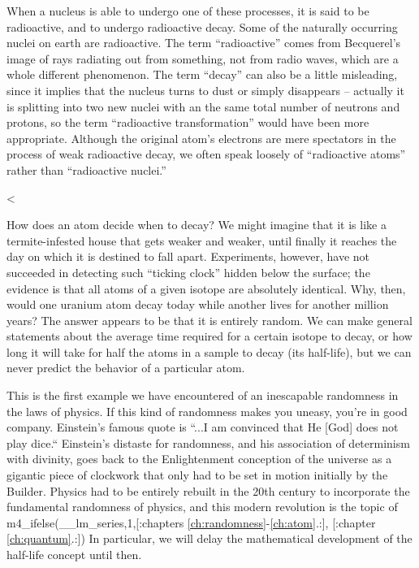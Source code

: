         When a nucleus is able to undergo one of these processes, it
        is said to be radioactive, and to undergo radioactive decay.
        Some of the naturally occurring nuclei on earth are
        radioactive. The term ``radioactive'' comes from Becquerel's
        image of rays radiating out from something, not from radio
        waves, which are a whole different phenomenon. The term
        ``decay'' can also be a little misleading, since it implies
        that the nucleus turns to dust or simply disappears --
        actually it is splitting into two new nuclei with an the
        same total number of neutrons and protons, so the term
        ``radioactive transformation'' would have been more
        appropriate. Although the original atom's electrons are mere
        spectators in the process of weak radioactive decay, we
        often speak loosely of ``radioactive atoms'' rather than
        ``radioactive nuclei.''

    <%

        How does an atom decide when to decay? We might imagine that
        it is like a termite-infested house that gets weaker and
        weaker, until finally it reaches the day on which it is
        destined to fall apart. Experiments, however, have not
        succeeded in detecting such ``ticking clock'' hidden below
        the surface; the evidence is that all atoms of a given
        isotope are absolutely identical. Why, then, would one
        uranium atom decay today while another lives for another
        million years? The answer appears to be that it is entirely
        random. We can make general statements about the average
        time required for a certain isotope to decay, or how long it
        will take for half the atoms in a sample to decay (its
        half-life), but we can never predict the behavior of a particular atom.

        This is the first example we have encountered of an
        inescapable randomness in the laws of physics. If this kind
        of randomness makes you uneasy, you're in good company. 
        Einstein's famous quote is ``...I am convinced that He [God]
        does not play dice.``  Einstein's distaste for randomness,
        and his association of determinism with divinity, goes back
        to the Enlightenment conception of the universe as a
        gigantic piece of clockwork that only had to be set in
        motion initially by the Builder. Physics had to be entirely
        rebuilt in the 20th century to incorporate the fundamental
        randomness of physics, and this modern revolution is the
        topic of %
        m4_ifelse(__lm_series,1,[:chapters \ref{ch:randomness}-\ref{ch:atom}.:],
        [:chapter \ref{ch:quantum}.:]) In particular, we will delay
        the mathematical development of the half-life concept until then.

